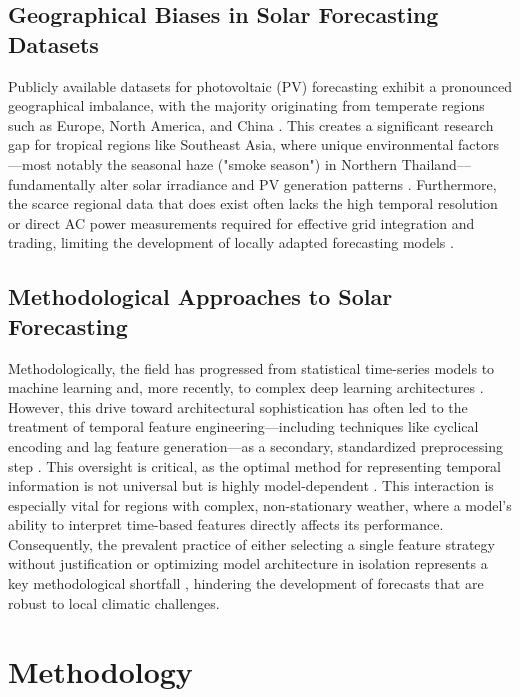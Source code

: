\documentclass[conference]{IEEEtran}
\begin{document}
\subsection{Geographical Biases in Solar Forecasting Datasets}
Publicly available datasets for photovoltaic (PV) forecasting exhibit a pronounced geographical imbalance, with the majority originating from temperate regions such as Europe, North America, and China \cite{EuropeanDataset2019, NREL2018, ChinaSolar2020}. This creates a significant research gap for tropical regions like Southeast Asia, where unique environmental factors—most notably the seasonal haze ("smoke season") in Northern Thailand—fundamentally alter solar irradiance and PV generation patterns \cite{Amnuaylojaroen2020, ASEANEnergy2022}. Furthermore, the scarce regional data that does exist often lacks the high temporal resolution or direct AC power measurements required for effective grid integration and trading, limiting the development of locally adapted forecasting models \cite{Seng2021, Ahmed2020}.

\subsection{Methodological Approaches to Solar Forecasting}
Methodologically, the field has progressed from statistical time-series models to machine learning and, more recently, to complex deep learning architectures \cite{LeCun2015, Hochreiter1997}. However, this drive toward architectural sophistication has often led to the treatment of temporal feature engineering—including techniques like cyclical encoding and lag feature generation—as a secondary, standardized preprocessing step \cite{Cerqueira2020, BoxJenkins1976}. This oversight is critical, as the optimal method for representing temporal information is not universal but is highly model-dependent \cite{Bommes2021}. This interaction is especially vital for regions with complex, non-stationary weather, where a model's ability to interpret time-based features directly affects its performance. Consequently, the prevalent practice of either selecting a single feature strategy without justification or optimizing model architecture in isolation represents a key methodological shortfall \cite{Wang2019}, hindering the development of forecasts that are robust to local climatic challenges.



\section{Methodology}
\end{document}
